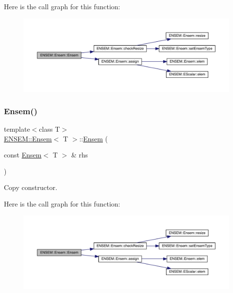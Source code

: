 Here is the call graph for this function\+:
\nopagebreak
\begin{figure}[H]
\begin{center}
\leavevmode
\includegraphics[width=350pt]{d7/d3e/classENSEM_1_1Ensem_ab0e04ebf09af997fb7f1477cdc48145b_cgraph}
\end{center}
\end{figure}
\mbox{\label{classENSEM_1_1Ensem_a5e80cf6ad71f96ba2fa28cac27f06003}} 
\subsubsection{\texorpdfstring{Ensem()}{Ensem()}\hspace{0.1cm}{\footnotesize\ttfamily [3/6]}}
{\footnotesize\ttfamily template$<$class T$>$ \\
\mbox{\hyperlink{classENSEM_1_1Ensem}{E\+N\+S\+E\+M\+::\+Ensem}}$<$ T $>$\+::\mbox{\hyperlink{classENSEM_1_1Ensem}{Ensem}} (\begin{DoxyParamCaption}\item[{const \mbox{\hyperlink{classENSEM_1_1Ensem}{Ensem}}$<$ T $>$ \&}]{rhs }\end{DoxyParamCaption})\hspace{0.3cm}{\ttfamily [inline]}}



Copy constructor. 

Here is the call graph for this function\+:
\nopagebreak
\begin{figure}[H]
\begin{center}
\leavevmode
\includegraphics[width=350pt]{d7/d3e/classENSEM_1_1Ensem_a5e80cf6ad71f96ba2fa28cac27f06003_cgraph}
\end{center}
\end{figure}
\mbox{\label{classENSEM_1_1Ensem_a8875b85c5536f02d10db536a815984b6}} 

